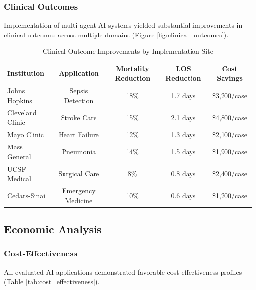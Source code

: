 \documentclass[12pt,letterpaper]{article}
\begin{document}
\subsubsection{Clinical Outcomes}

Implementation of multi-agent AI systems yielded substantial improvements in clinical outcomes across multiple domains (Figure \ref{fig:clinical_outcomes}).

\begin{table}[H]
\centering
\caption{Clinical Outcome Improvements by Implementation Site}
\label{tab:clinical_outcomes}
\begin{tabular}{@{}lcccc@{}}
\toprule
\textbf{Institution} & \textbf{Application} & \textbf{Mortality Reduction} & \textbf{LOS Reduction} & \textbf{Cost Savings} \\
\midrule
Johns Hopkins & Sepsis Detection & 18\% & 1.7 days & \$3,200/case \\
Cleveland Clinic & Stroke Care & 15\% & 2.1 days & \$4,800/case \\
Mayo Clinic & Heart Failure & 12\% & 1.3 days & \$2,100/case \\
Mass General & Pneumonia & 14\% & 1.5 days & \$1,900/case \\
UCSF Medical & Surgical Care & 8\% & 0.8 days & \$2,400/case \\
Cedars-Sinai & Emergency Medicine & 10\% & 0.6 days & \$1,200/case \\
\bottomrule
\end{tabular}
\end{table}

\subsection{Economic Analysis}

\subsubsection{Cost-Effectiveness}

All evaluated AI applications demonstrated favorable cost-effectiveness profiles (Table \ref{tab:cost_effectiveness}).
\end{document}
